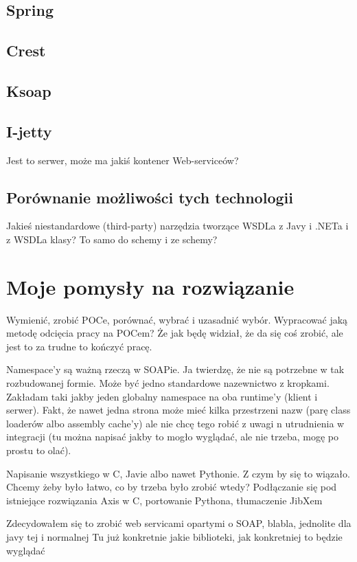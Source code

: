 \subsection{Spring}
\subsection{Crest}
\subsection{Ksoap}

\subsection{I-jetty}
Jest to serwer, może ma jakiś kontener Web-serviceów?

\subsection{Porównanie możliwości tych technologii}

Jakieś niestandardowe (third-party) narzędzia tworzące WSDLa z Javy i .NETa i z WSDLa klasy? To samo do schemy i ze schemy?

\section{Moje pomysły na rozwiązanie}
Wymienić, zrobić POCe, porównać, wybrać i uzasadnić wybór. Wypracować jaką metodę odcięcia pracy na POCem? Że jak będę widział, że da się coś zrobić, ale jest to za trudne to kończyć pracę.

Namespace'y są ważną rzeczą w SOAPie. Ja twierdzę, że nie są potrzebne w tak rozbudowanej formie. Może być jedno standardowe nazewnictwo z kropkami. Zakładam taki jakby jeden globalny namespace na oba runtime'y (klient i serwer). Fakt, że nawet jedna strona może mieć kilka przestrzeni nazw (parę class loaderów albo assembly cache'y) ale nie chcę tego robić z uwagi n utrudnienia w integracji (tu można napisać jakby to mogło wyglądać, ale nie trzeba, mogę po prostu to olać).

Napisanie wszystkiego w C, Javie albo nawet Pythonie. Z czym by się to wiązało. Chcemy żeby było łatwo, co by trzeba było zrobić wtedy?
Podłączanie się pod istniejące rozwiązania Axis w C, portowanie Pythona, tłumaczenie JibXem

Zdecydowałem się to zrobić web servicami opartymi o SOAP, blabla, jednolite dla javy tej i normalnej
Tu już konkretnie jakie biblioteki, jak konkretniej to będzie wyglądać

